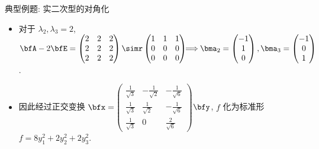 \begin{frame}{典型例题: 实二次型的对角化}\small
\beqskip{7pt}
	\onslide<+->
	\begin{solution}[续解]
		\begin{itemize}
			\item 对于 $\lambda_2,\lambda_3=2$, $\bfA-2\bfE=\begin{pmatrix}
				2&2&2\\
				2&2&2\\
				2&2&2
			\end{pmatrix}\simr\begin{pmatrix}
				1&1&1\\
				0&0&0\\
				0&0&0
			\end{pmatrix}\!\!\!\!\implies\!\!\bma_2=\begin{pmatrix}
				-1\\1\\0
			\end{pmatrix},\bma_3=\begin{pmatrix}
				-1\\0\\1
			\end{pmatrix}$.

			\item 因此经过正交变换 $\bfx=${\large$\begin{pmatrix}
				\frac1{\sqrt3}&-\frac1{\sqrt2}&-\frac1{\sqrt6}\\
				\frac1{\sqrt3}&\frac1{\sqrt2}&-\frac1{\sqrt6}\\
				\frac1{\sqrt3}&0&\frac2{\sqrt6}
			\end{pmatrix}$}$\bfy$, $f$ 化为标准形 $f=8y_1^2+2y_2^2+2y_3^2$.
		\end{itemize}
		\vspace{-.5\baselineskip}
	\end{solution}
\endgroup
\end{frame}


